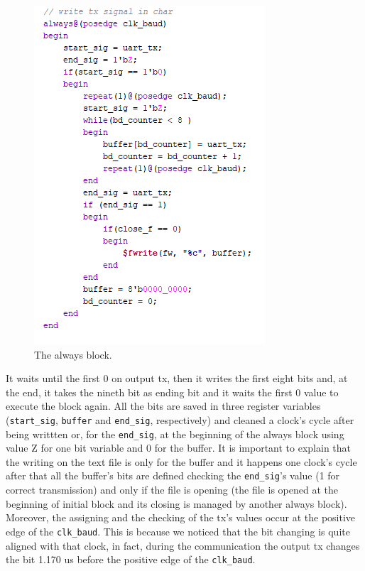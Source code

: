 \begin{figure}[!hbp]
  \includegraphics{./../../img/Images/tx_decoding_block} %
  \caption{The always block.}
  \label{always_block}
\end{figure}

It waits until the first 0 on output tx, then it writes the first eight bits and, at the end, it takes the nineth bit as ending bit and it waits the first 0 value to execute the block again.
All the bits are saved in three register variables ({\verb+start_sig+}, {\verb+buffer+} and { \verb+end_sig+}, respectively) and cleaned a clock’s cycle after being writtten or, for the { \verb+end_sig+}, at the beginning of the always block using value Z for one bit variable and 0 for the buffer.
It is important to explain that the writing on the text file is only for the buffer and it happens one clock’s cycle after that all the buffer’s bits are defined checking the { \verb+end_sig+}’s value (1 for correct transmission) and only if the file is opening (the file is opened at the beginning of initial block and its closing is managed by another always block).
Moreover, the assigning and the checking of the tx’s values occur at the positive edge of the { \verb+clk_baud+}. This is because we noticed that the bit changing is quite aligned with that clock, in fact, during the communication the output tx changes the bit 1.170 us before the positive edge of the { \verb+clk_baud+}.
